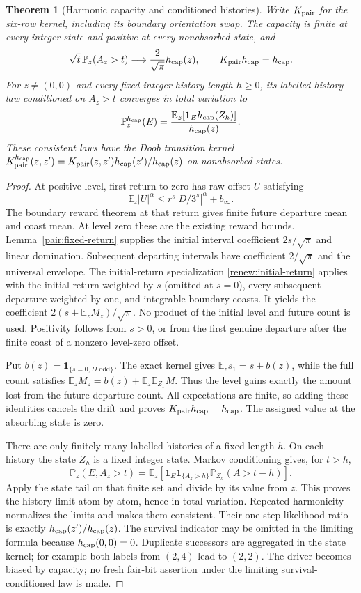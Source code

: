 \documentclass[11pt]{amsart}
\newtheorem{theorem}{Theorem}[section]
\theoremstyle{definition}
\theoremstyle{remark}
\newcommand{\E}{\mathbb E}
\newcommand{\PP}{\mathbb P}
\newcommand{\one}{\mathbf 1}
\begin{document}
\begin{theorem}[Harmonic capacity and conditioned histories]\label{harm:law}
Write $K_{\rm pair}$ for the six-row kernel, including its boundary
orientation swap. The capacity is finite at every integer state and
positive at every nonabsorbed state,
and
\[
 \sqrt t\,\PP_z(A_z>t)\longrightarrow\frac2{\sqrt\pi}h_{\rm cap}(z),
 \qquad K_{\rm pair}h_{\rm cap}=h_{\rm cap}.
\]
For $z\ne(0,0)$ and every fixed integer history length $h\ge0$, its labelled-history law conditioned
on $A_z>t$ converges in total variation to
\[
 \PP_z^{h_{\rm cap}}(E)=\frac{\E_z[\one_E h_{\rm cap}(Z_h)]}{h_{\rm cap}(z)}.
\]
These consistent laws have the Doob transition kernel
$K_{\rm pair}^{h_{\rm cap}}(z,z')=K_{\rm pair}(z,z')h_{\rm cap}(z')/h_{\rm cap}(z)$ on nonabsorbed states.
\end{theorem}
\begin{proof}
At positive level, first return to zero has raw offset $U$ satisfying
\[
 \E_z|U|^\alpha\le r^s|D/3^s|^\alpha+b_\infty.
\]
The boundary reward theorem at that return gives finite future departure
mean and coast mean. At level zero these are the existing reward bounds.
Lemma~\ref{pair:fixed-return} supplies the initial interval coefficient
$2s/\sqrt\pi$ and linear domination. Subsequent departing intervals have
coefficient $2/\sqrt\pi$ and the universal envelope.
The initial-return specialization \eqref{renew:initial-return} applies with the initial return weighted
by $s$ (omitted at $s=0$), every subsequent departure weighted by one,
and integrable boundary coasts. It yields the coefficient
$2(s+\E_zM_z)/\sqrt\pi$.
No product of the initial level and future count is used. Positivity
follows from $s>0$, or from the first genuine departure after the finite
coast of a nonzero level-zero offset.

Put $b(z)=\one_{\{s=0,D\text{ odd}\}}$. The exact kernel gives
$\E_z s_1=s+b(z)$, while the full count satisfies
$\E_zM_z=b(z)+\E_z\E_{Z_1}M$. Thus the level gains exactly the
amount lost from the future departure count. All expectations are
finite, so adding these identities cancels the drift and proves
$K_{\rm pair}h_{\rm cap}=h_{\rm cap}$. The assigned value at the
absorbing state is zero.

There are only finitely many labelled histories of a fixed length $h$.
On each history the state $Z_h$ is a fixed integer state.
Markov conditioning gives, for $t>h$,
\[
 \PP_z(E,A_z>t)=
 \E_z[\one_E\one_{\{A_z>h\}}\PP_{Z_h}(A>t-h)].
\]
Apply the state tail on that finite set and divide by its value from $z$.
This proves the history limit atom by atom, hence in total variation.
Repeated harmonicity normalizes the limits and makes them consistent.
Their one-step likelihood ratio is exactly $h_{\rm cap}(z')/h_{\rm cap}(z)$.
The survival indicator may be omitted in the limiting formula because
$h_{\rm cap}(0,0)=0$. Duplicate successors are aggregated in the state kernel;
for example both labels from $(2,4)$ lead to $(2,2)$.
The driver becomes biased by capacity; no fresh fair-bit assertion under
the limiting survival-conditioned law is made.
\end{proof}
\end{document}
